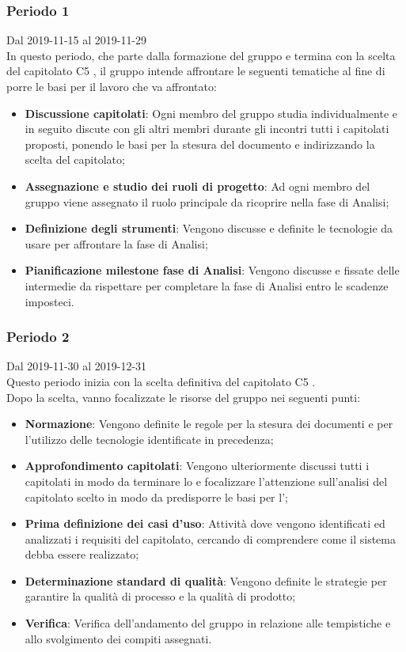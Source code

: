 \subsubsection{Periodo 1}
Dal 2019-11-15 al 2019-11-29\\
In questo periodo, che parte dalla formazione del gruppo e termina con la scelta del capitolato C5 \NomeProgetto{}, il gruppo intende affrontare le seguenti tematiche al fine di porre le basi per il lavoro che va affrontato:
\begin{itemize}
	\item \textbf{Discussione capitolati}: Ogni membro del gruppo studia individualmente e in seguito discute con gli altri membri durante gli incontri tutti i capitolati proposti, ponendo le basi per la stesura del documento \SdF{} e indirizzando la scelta del capitolato;
	\item \textbf{Assegnazione e studio dei ruoli di progetto}: Ad ogni membro del gruppo viene assegnato il ruolo principale da ricoprire nella fase di Analisi;
	\item \textbf{Definizione degli strumenti}: Vengono discusse e definite le tecnologie da usare per affrontare la fase di Analisi;
	\item \textbf{Pianificazione milestone fase di Analisi}: Vengono discusse e fissate delle  intermedie da rispettare per completare la fase di Analisi entro le scadenze imposteci.
\end{itemize}

\subsubsection{Periodo 2} 
Dal 2019-11-30 al 2019-12-31\\
Questo periodo inizia con la scelta definitiva del capitolato C5 \NomeProgetto{}.\\
Dopo la scelta, vanno focalizzate le risorse del gruppo nei seguenti punti:
\begin{itemize}
	\item \textbf{Normazione}: Vengono definite le regole per la stesura dei documenti e per l'utilizzo delle tecnologie identificate in precedenza;
	\item \textbf{Approfondimento capitolati}: Vengono ulteriormente discussi tutti i capitolati in modo da terminare lo \SdF{} e focalizzare l'attenzione sull'analisi del capitolato scelto in modo da predisporre le basi per l'\AdR{};
	\item \textbf{Prima definizione dei casi d'uso}: Attività dove vengono identificati ed analizzati i requisiti del capitolato, cercando di comprendere come il sistema debba essere realizzato;
	\item \textbf{Determinazione standard di qualità}: Vengono definite le strategie per garantire la qualità di processo e la qualità di prodotto;
	\item \textbf{Verifica}: Verifica dell'andamento del gruppo in relazione alle tempistiche e allo svolgimento dei compiti assegnati.
\end{itemize}

